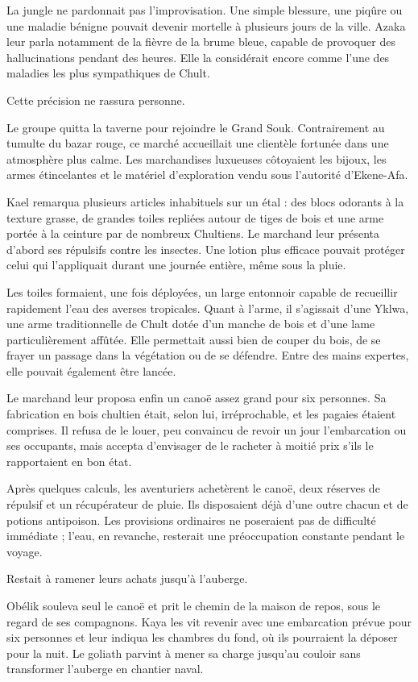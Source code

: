 La jungle ne pardonnait pas l'improvisation. Une simple blessure, une piqûre ou une maladie bénigne pouvait devenir mortelle à plusieurs jours de la ville. Azaka leur parla notamment de la fièvre de la brume bleue, capable de provoquer des hallucinations pendant des heures. Elle la considérait encore comme l'une des maladies les plus sympathiques de Chult.

Cette précision ne rassura personne.

Le groupe quitta la taverne pour rejoindre le Grand Souk. Contrairement au tumulte du bazar rouge, ce marché accueillait une clientèle fortunée dans une atmosphère plus calme. Les marchandises luxueuses côtoyaient les bijoux, les armes étincelantes et le matériel d'exploration vendu sous l'autorité d'Ekene-Afa.

Kael remarqua plusieurs articles inhabituels sur un étal : des blocs odorants à la texture grasse, de grandes toiles repliées autour de tiges de bois et une arme portée à la ceinture par de nombreux Chultiens. Le marchand leur présenta d'abord ses répulsifs contre les insectes. Une lotion plus efficace pouvait protéger celui qui l'appliquait durant une journée entière, même sous la pluie.

Les toiles formaient, une fois déployées, un large entonnoir capable de recueillir rapidement l'eau des averses tropicales. Quant à l'arme, il s'agissait d'une Yklwa, une arme traditionnelle de Chult dotée d'un manche de bois et d'une lame particulièrement affûtée. Elle permettait aussi bien de couper du bois, de se frayer un passage dans la végétation ou de se défendre. Entre des mains expertes, elle pouvait également être lancée.

Le marchand leur proposa enfin un canoë assez grand pour six personnes. Sa fabrication en bois chultien était, selon lui, irréprochable, et les pagaies étaient comprises. Il refusa de le louer, peu convaincu de revoir un jour l'embarcation ou ses occupants, mais accepta d'envisager de le racheter à moitié prix s'ils le rapportaient en bon état.

Après quelques calculs, les aventuriers achetèrent le canoë, deux réserves de répulsif et un récupérateur de pluie. Ils disposaient déjà d'une outre chacun et de potions antipoison. Les provisions ordinaires ne poseraient pas de difficulté immédiate ; l'eau, en revanche, resterait une préoccupation constante pendant le voyage.

Restait à ramener leurs achats jusqu'à l'auberge.

Obélik souleva seul le canoë et prit le chemin de la maison de repos, sous le regard de ses compagnons. Kaya les vit revenir avec une embarcation prévue pour six personnes et leur indiqua les chambres du fond, où ils pourraient la déposer pour la nuit. Le goliath parvint à mener sa charge jusqu'au couloir sans transformer l'auberge en chantier naval.

